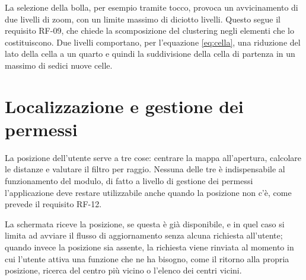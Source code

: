 
La selezione della bolla, per esempio tramite tocco, provoca un avvicinamento di due livelli di zoom, con un limite massimo di diciotto livelli.
Questo segue il requisito RF-09, che chiede la scomposizione del clustering negli elementi che lo costituiscono.
Due livelli comportano, per l'equazione \ref{eq:cella}, una riduzione del lato della cella a un quarto e quindi la suddivisione della cella di
partenza in un massimo di sedici nuove celle.

\section{Localizzazione e gestione dei permessi}\label{sec:impl-localizzazione}

La posizione dell'utente serve a tre cose: centrare la mappa all'apertura, calcolare le distanze e valutare il filtro per raggio.
Nessuna delle tre è indispensabile al funzionamento del modulo, di fatto a livello di gestione dei permessi
l'applicazione deve restare utilizzabile anche quando la posizione non c'è, come prevede il requisito RF-12.

La schermata riceve la posizione, se questa è già disponibile, e in quel caso si limita ad avviare il flusso di
aggiornamento senza alcuna richiesta all'utente; quando invece la posizione sia assente, la richiesta viene rinviata al momento in cui
l'utente attiva una funzione che ne ha bisogno, come il ritorno alla propria posizione, ricerca del centro più vicino o l'elenco dei centri vicini.


